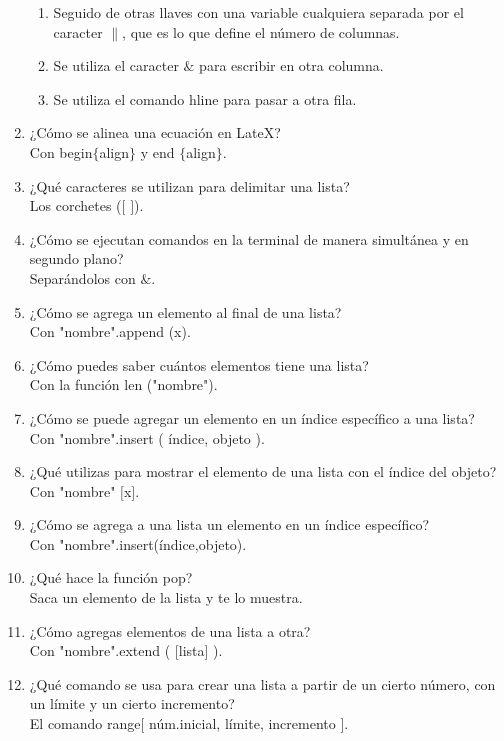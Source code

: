 \documentclass[letterpaper, 12pt, oneside]{article} %
\begin{document}
\begin{enumerate}
\begin{enumerate}
			\item Seguido de otras llaves con una variable cualquiera separada por el caracter $\|$, que es lo que define el número de columnas.
			\item Se utiliza el caracter $\&$ para escribir en otra columna. 
			\item Se utiliza el comando hline para pasar a otra fila.
		\end{enumerate}
		\item ¿Cómo se alinea una ecuación en LateX?\\Con begin$\{$align$\}$ y end $\{$align$\}$.
		\item ¿Qué caracteres se utilizan para delimitar una lista?\\Los corchetes ($[$ $]$).
		\item ¿Cómo se ejecutan comandos en la terminal de manera simultánea y en segundo plano?\\Separándolos con $\&$.
		\item ¿Cómo se agrega un elemento al final de una lista?\\Con "nombre".append (x).
		\item ¿Cómo puedes saber cuántos elementos tiene una lista?\\Con la función len ("nombre").
		\item ¿Cómo se puede agregar un elemento en un índice específico a una lista?\\Con "nombre".insert ( índice, objeto ).
		\item ¿Qué utilizas para mostrar el elemento de una lista con el índice del objeto?\\Con "nombre" $[$x$]$.
		\item ¿Cómo se agrega a una lista un elemento en un índice específico?\\Con "nombre".insert(índice,objeto).
		\item ¿Qué hace la función pop?\\Saca un elemento de la lista y te lo muestra. 
		\item ¿Cómo agregas elementos de una lista a otra?\\Con "nombre".extend ( [lista] ).
		\item ¿Qué comando se usa para crear una lista a partir de un cierto número, con un límite y un cierto incremento?\\El comando range[ núm.inicial, límite, incremento ].
	\end{enumerate}
\end{document}

